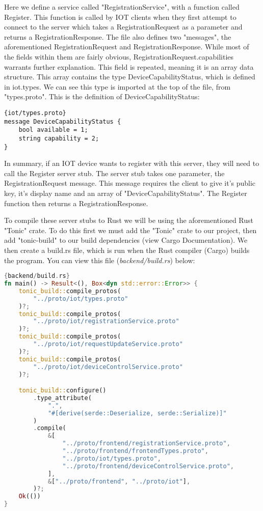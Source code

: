 Here we define a service called "RegistrationService", with a function called Register. This function is called by IOT clients when they first attempt to connect to the server which takes a RegistrationRequest as a parameter and returns a RegistrationResponse. The file also defines two "messages", the aforementioned RegistrationRequest and RegistrationResponse. While most of the fields within them are fairly obvious, RegistrationRequest.capabilities warrants further explanation.
    This field is repeated, meaning it is an array data structure. This array contains the type DeviceCapabilityStatus, which is defined in iot.types. We can see this type is imported at the top of the file, from "types.proto". This is the definition of DeviceCapabilityStatus:

\begin{lstlisting}[language=protobuf3, style=boxed]{iot/types.proto}
message DeviceCapabilityStatus {
    bool available = 1;
    string capability = 2;
}
\end{lstlisting}

In summary, if an IOT device wants to register with this server, they will need to call the Register server stub. The server stub takes one parameter, the RegistrationRequest message. This message requires the client to give it's public key, it's display name and an array of "DeviceCapabilityStatus". The Register function then returns a RegistrationResponse. 

To compile these server stubs to Rust we will be using the aforementioned Rust "Tonic" crate. To do this first we must add the "Tonic" crate to our project, then add "tonic-build" to our build dependencies (view Cargo Documentation). We then create a build.rs file, which is run when the Rust compiler (Cargo) builds the program. You can view this file (\textit{backend/build.rs}) below:

\begin{lstlisting}[language=Rust, style=boxed, showstringspaces=false]{backend/build.rs}
fn main() -> Result<(), Box<dyn std::error::Error>> {
    tonic_build::compile_protos(
        "../proto/iot/types.proto"
    )?;
    tonic_build::compile_protos(
        "../proto/iot/registrationService.proto"
    )?;
    tonic_build::compile_protos(
        "../proto/iot/requestUpdateService.proto"
    )?;
    tonic_build::compile_protos(
        "../proto/iot/deviceControlService.proto"
    )?;

    tonic_build::configure()
        .type_attribute(
            ".", 
            "#[derive(serde::Deserialize, serde::Serialize)]"
        )
        .compile(
            &[
                "../proto/frontend/registrationService.proto",
                "../proto/frontend/frontendTypes.proto",
                "../proto/iot/types.proto",
                "../proto/frontend/deviceControlService.proto",
            ],
            &["../proto/frontend", "../proto/iot"],
        )?;
    Ok(())
}
\end{lstlisting}

